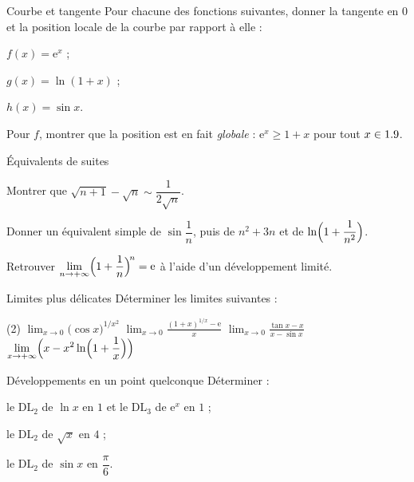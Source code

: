 \begin{exercice}[1]{Courbe et tangente}
Pour chacune des fonctions suivantes, donner la tangente en $0$ et la
position locale de la courbe par rapport à elle :
\begin{questions}
  \item $f(x)=\mathrm{e}^{x}$ ;
  \item $g(x)=\ln(1+x)$ ;
  \item $h(x)=\sin x$.
\end{questions}
Pour $f$, montrer que la position est en fait \emph{globale} :
$\mathrm{e}^{x}\geqslant1+x$ pour tout $x\in1.9$.
\end{exercice}

\begin{exercice}[1]{Équivalents de suites}
\begin{questions}
  \item Montrer que $\sqrt{n+1}-\sqrt{n}\sim\dfrac{1}{2\sqrt{n}}$.
  \item Donner un équivalent simple de $\sin\dfrac1n$, puis de
    $n^{2}+3n$ et de $\ln\Bigl(1+\dfrac{1}{n^{2}}\Bigr)$.
  \item Retrouver $\displaystyle\lim_{n\to+\infty}\Bigl(1+\frac1n\Bigr)^{\!n}=\mathrm{e}$
    à l'aide d'un développement limité.
\end{questions}
\end{exercice}


\begin{exercice}[2]{Limites plus délicates}
Déterminer les limites suivantes :
\begin{tasks}(2)
  \task $\displaystyle\lim_{x\to0}\bigl(\cos x\bigr)^{1/x^{2}}$
  \task $\displaystyle\lim_{x\to0}\frac{(1+x)^{1/x}-\mathrm{e}}{x}$
  \task $\displaystyle\lim_{x\to0}\frac{\tan x-x}{x-\sin x}$
  \task $\displaystyle\lim_{x\to+\infty}\Bigl(x-x^{2}\ln\Bigl(1+\frac1x\Bigr)\Bigr)$
\end{tasks}
\end{exercice}

\begin{exercice}[2]{Développements en un point quelconque}
Déterminer :
\begin{questions}
  \item le $\mathrm{DL}_{2}$ de $\ln x$ en $1$ et le $\mathrm{DL}_{3}$ de
    $\mathrm{e}^{x}$ en $1$ ;
  \item le $\mathrm{DL}_{2}$ de $\sqrt{x}$ en $4$ ;
  \item le $\mathrm{DL}_{2}$ de $\sin x$ en $\dfrac{\pi}{6}$.
\end{questions}
\end{exercice}

